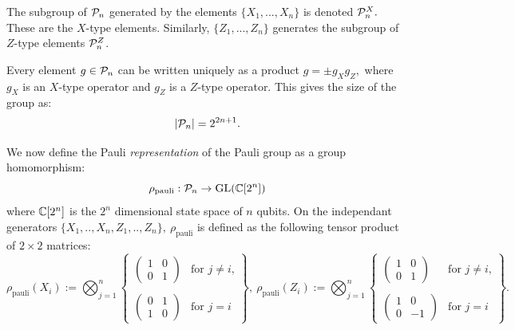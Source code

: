 \documentclass[12pt,notitlepage,longbibliography,nofootinbib,tightenlines]{revtex4}
\begin{document}
The subgroup of $\mathcal{P}_n$ generated by
the elements $\{X_1,...,X_n\}$ %
is denoted $\mathcal{P}_n^X.$ These are the $X$-type
elements. Similarly,
 $\{Z_1,...,Z_n\}$ generates %
the subgroup of $Z$-type elements $\mathcal{P}_n^Z$.

Every element $g\in\mathcal{P}_n$ can be written
uniquely as a product $g = \pm g_X g_Z,$
where $g_X$ is an $X$-type operator and $g_Z$
is a $Z$-type operator.
This gives the size of the group as:
$$
    |\mathcal{P}_n| = 2^{2n+1}.
$$

We now define the
Pauli {\it representation} 
of the Pauli group as a group homomorphism:
$$
    \rho_{\mathrm{pauli}} : \mathcal{P}_n \to \mathrm{GL}(\mathbb{C}[2^n])
$$
where $\mathbb{C}[2^n]$ is the $2^n$ dimensional state space of $n$ qubits.
On the independant generators 
$\{X_1, .., X_n, Z_1, .., Z_n\},\ \rho_{\mathrm{pauli}}$
is defined as the following tensor product of $2\times 2$ matrices:
$$
\rho_{\mathrm{pauli}}(X_i) := \bigotimes_{j=1}^n \left\{ \begin{array}{ll}
\left( \begin{array}{ll}
1&0\\
0&1\end{array} \right) &\mbox{for $j\ne i$,}\\
\\
\left( \begin{array}{ll}
0&1\\
1&0\end{array} \right) &\mbox{for $j=i$} \end{array}
\right\},\ 
\rho_{\mathrm{pauli}}(Z_i) := \bigotimes_{j=1}^n \left\{ \begin{array}{ll}
\left( \begin{array}{ll}
1&0\\
0&1\end{array} \right) &\mbox{for $j\ne i$,}\\
\\
\left( \begin{array}{rr}
1&0\\
0&-1\end{array} \right) &\mbox{for $j=i$}\end{array}
\right\}.
$$

\end{document}
